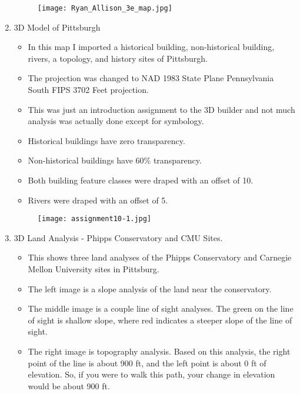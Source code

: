 \documentclass{article}
\begin{document}
\begin{enumerate}
			
			\begin{figure}[H]
				\centering
				\texttt{[image: Ryan\_Allison\_3e\_map.jpg]}
				\caption{}
				\label{fig:method}
				\end{figure}
	
\newpage	



\item 3D Model of Pittsburgh
	\begin{itemize}
	\item In this map I imported a historical building, non-historical building, rivers, a topology, and history sites of Pittsburgh. 
	\item The projection was changed to NAD 1983 State Plane Pennsylvania South FIPS 3702 Feet projection. 
	\item This was just an introduction assignment to the 3D builder and not much analysis was actually done except for symbology.
	\item Historical buildings have zero transparency. 
	\item Non-historical buildings have 60\% transparency. 
	\item Both building feature classes were draped with an offset of 10.
	\item Rivers were draped with an offset of 5. 

	\end{itemize}		
		
			
			\begin{figure}[H]
				\centering
				\texttt{[image: assignment10-1.jpg]}
				\caption{}
				\label{fig:method}
				\end{figure}

\newpage	



\item 3D Land Analysis - Phipps Conservatory and CMU Sites.
	\begin{itemize}
	\item This shows three land analyses of the Phipps Conservatory and Carnegie Mellon University sites in Pittsburg. 
	\item The left image is a slope analysis of the land near the conservatory. 
	\item The middle image is a couple line of sight analyses. The green on the line of sight is shallow slope, where red indicates a steeper slope of the line of sight. 
	\item The right image is topography analysis. Based on this analysis, the right point of the line is about 900 ft, and the left point is about 0 ft of elevation. So, if you were to walk this path, your change in elevation would be about 900 ft. 
	\end{itemize}		
		

\end{enumerate}
\end{document}
